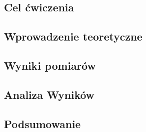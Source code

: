 \documentclass[11pt]{article}
\begin{document}
\vspace{2cm}

\subsection*{Cel ćwiczenia}
\subsection*{Wprowadzenie teoretyczne}
\subsection*{Wyniki pomiarów}
\subsection*{Analiza Wyników}
\subsection*{Podsumowanie}
\end{document}
